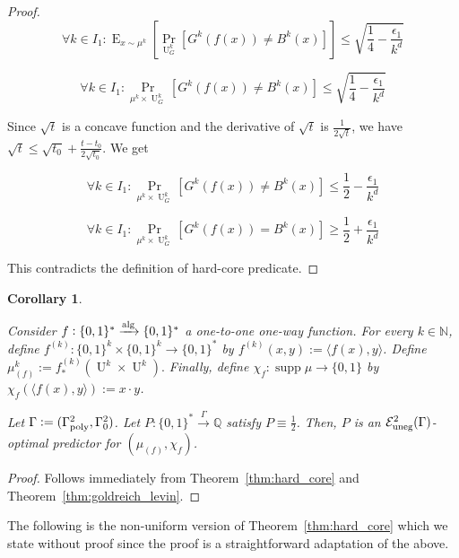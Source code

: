 \documentclass{article}
\numberwithin{equation}{section}
\theoremstyle{definition}
\theoremstyle{plain}
\newtheorem{corollary}{Corollary}[section]
\newcommand{\Bool}{\{0,1\}}
\newcommand{\Words}{{\Bool^*}}
\newcommand{\WordsLen}[1]{{\Bool^{#1}}}
\DeclareMathOperator{\Supp}{supp}
\DeclareMathOperator{\Prb}{Pr}
\DeclareMathOperator{\E}{E}
\DeclareMathOperator{\U}{U}
\newcommand{\Nats}{\mathbb{N}}
\newcommand{\Rats}{\mathbb{Q}}
\newcommand{\Chev}[1]{\langle #1 \rangle}
\newcommand{\Fall}{\mathcal{E}}
\newcommand{\Alg}{\xrightarrow{\textnormal{alg}}}
\newcommand{\Scheme}{\xrightarrow{\Gamma}}
\begin{document}
\begin{proof}
$$ \forall k \in I_1: \E_{x \sim \mu^k}[\Prb_{\U_G^k}[G^k(f(x)) \ne B^k(x)]] \leq \sqrt{\frac{1}{4} - \frac{\epsilon_1}{k^d}} $$

$$ \forall k \in I_1: \Prb_{\mu^k \times \U_G^k}[G^k(f(x)) \ne B^k(x)] \leq \sqrt{\frac{1}{4} - \frac{\epsilon_1}{k^d}} $$

Since $\sqrt{t}$ is a concave function and the derivative of $\sqrt{t}$ is $\frac{1}{2\sqrt{t}}$, we have $\sqrt{t} \leq \sqrt{t_0} + \frac{t-t_0}{2\sqrt{t_0}}$. We get

$$ \forall k \in I_1: \Prb_{\mu^k \times \U_G^k}[G^k(f(x)) \ne B^k(x)] \leq \frac{1}{2}-\frac{\epsilon_1}{k^d}$$

$$ \forall k \in I_1: \Prb_{\mu^k \times \U_G^k}[G^k(f(x)) = B^k(x)] \geq \frac{1}{2}+\frac{\epsilon_1}{k^d}$$

This contradicts the definition of hard-core predicate.

\end{proof}

\begin{corollary}
\label{thm:one_way}

Consider $f: \Words \Alg \Words$ a one-to-one one-way function. For every $k \in \Nats$, define $f^{(k)}: \WordsLen{k} \times \WordsLen{k} \rightarrow \Words$ by ${f^{(k)}(x,y):=\Chev{f(x),y}}$. Define $\mu_{(f)}^k:=f_*^{(k)}(\U^k \times \U^k).$ Finally, define $\chi_f: \Supp \mu \rightarrow \Bool$ by ${\chi_f(\Chev{f(x),y}):=x \cdot y}$.

Let $\Gamma:=(\Gamma_{\textnormal{poly}}^2,\Gamma_0^2)$. Let $P: \Words \Scheme \Rats$ satisfy $P \equiv \frac{1}{2}$. Then, $P$ is an $\Fall_{\textnormal{uneg}}^2(\Gamma)$-optimal predictor for $(\mu_{(f)}, \chi_f)$.

\end{corollary}

\begin{proof}

Follows immediately from Theorem~\ref{thm:hard_core} and Theorem~\ref{thm:goldreich_levin}.

\end{proof}

The following is the non-uniform version of Theorem~\ref{thm:hard_core} which we state without proof since the proof is a straightforward adaptation of the above.
\end{document}

